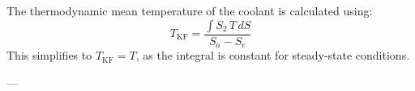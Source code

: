 The thermodynamic mean temperature of the coolant is calculated using:  
\[
T_\text{KF} = \frac{\int S_2 \, T \, dS}{S_a - S_e}
\]  
This simplifies to \( T_\text{KF} = T \), as the integral is constant for steady-state conditions.  

---